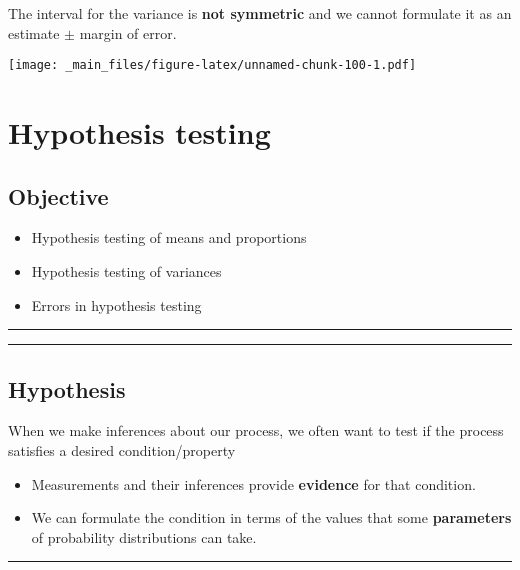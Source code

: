 \documentclass[
]{book}
\providecommand{\tightlist}{%
  \setlength{\itemsep}{0pt}\setlength{\parskip}{0pt}}
\begin{document}
The interval for the variance is \textbf{not symmetric} and we cannot formulate it as an estimate \(\pm\) margin of error.

\texttt{[image: \_main\_files/figure-latex/unnamed-chunk-100-1.pdf]}

\hypertarget{hypothesis-testing}{%
\chapter{Hypothesis testing}\label{hypothesis-testing}}

\hypertarget{objective-13}{%
\section{Objective}\label{objective-13}}

\begin{itemize}
\tightlist
\item
  Hypothesis testing of means and proportions
\item
  Hypothesis testing of variances
\item
  Errors in hypothesis testing
\end{itemize}

\begin{center}\rule{0.5\linewidth}{0.5pt}\end{center}

\begin{center}\rule{0.5\linewidth}{0.5pt}\end{center}

\hypertarget{hypothesis}{%
\section{Hypothesis}\label{hypothesis}}

When we make inferences about our process, we often want to test if the process satisfies a desired condition/property

\begin{itemize}
\item
  Measurements and their inferences provide \textbf{evidence} for that condition.
\item
  We can formulate the condition in terms of the values that some \textbf{parameters} of probability distributions can take.
\end{itemize}

\begin{center}\rule{0.5\linewidth}{0.5pt}\end{center}
\end{document}
